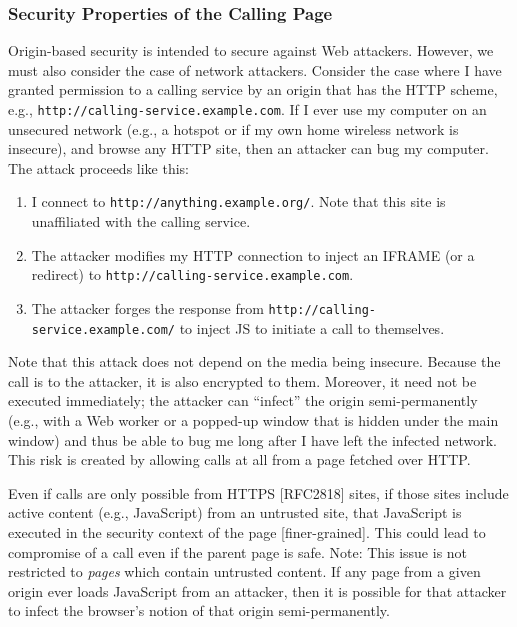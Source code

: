 \documentclass{article}
\begin{document}
\subsubsection{Security Properties of the Calling Page}

Origin-based security is intended to secure against Web attackers.
However, we must also consider the case of network attackers.
Consider the case where I have granted permission to a calling
service by an origin that has the HTTP scheme, e.g.,
\texttt{http://calling-service.example.com}.  If I ever use my computer on an
unsecured network (e.g., a hotspot or if my own home wireless network
is insecure), and browse any HTTP site, then an attacker can bug my
computer.  The attack proceeds like this:

\begin{enumerate}
\item I connect to \texttt{http://anything.example.org/}.  Note that this site
      is unaffiliated with the calling service.

\item The attacker modifies my HTTP connection to inject an IFRAME (or
      a redirect) to \texttt{http://calling-service.example.com}.

\item The attacker forges the response from
      \texttt{http://calling-service.example.com/} to inject JS to initiate a
      call to themselves.
\end{enumerate}

Note that this attack does not depend on the media being insecure.
Because the call is to the attacker, it is also encrypted to them.
Moreover, it need not be executed immediately; the attacker can
``infect'' the origin semi-permanently (e.g., with a Web worker or a
popped-up window that is hidden under the main window) and thus be
able to bug me long after I have left the infected network.  This
risk is created by allowing calls at all from a page fetched over
HTTP.

Even if calls are only possible from HTTPS [RFC2818] sites, if those
sites include active content (e.g., JavaScript) from an untrusted
site, that JavaScript is executed in the security context of the page
[finer-grained].  This could lead to compromise of a call even if the
parent page is safe.  Note: This issue is not restricted to \emph{pages}
which contain untrusted content.  If any page from a given origin
ever loads JavaScript from an attacker, then it is possible for that
attacker to infect the browser's notion of that origin semi-permanently.
\end{document}
